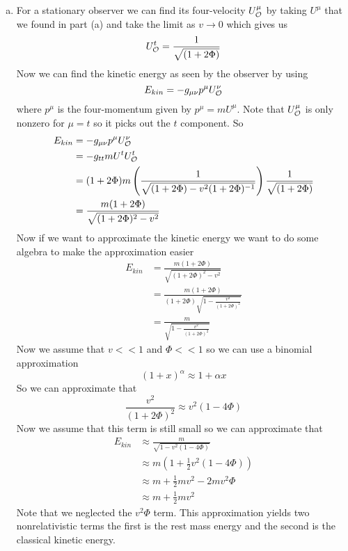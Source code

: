 \documentclass[11pt]{article}
\numberwithin{equation}{section}
\begin{document}
\begin{enumerate}[(a)]
\item
For a stationary observer we can find its four-velocity $U^{\mu}_{\mathcal{O}}$ by taking $U^{\mu}$ that we found in part (a) and take the limit as $v\rightarrow 0$ which gives us 
$$U^{t}_{\mathcal{O}} = \frac{1}{\sqrt{(1+2\Phi)}}$$
Now we can find the kinetic energy as seen by the observer by using
$$E_{kin} = -g_{\mu\nu}p^{\mu}U^{\nu}_{\mathcal{O}}$$
where $p^{\mu}$ is the four-momentum given by $p^{\mu} = mU^{\mu}$. Note that $U^{\mu}_{\mathcal{O}}$ is only nonzero for $\mu=t$ so it picks out the $t$ component. So
\begin{align*}
E_{kin} &= -g_{\mu\nu}p^{\mu}U^{\nu}_{\mathcal{O}}\\
&= -g_{tt}mU^{t}U^{t}_{\mathcal{O}}\\
&= (1+2\Phi)m\left(\frac{1}{\sqrt{(1+2\Phi) - v^2(1+2\Phi)^{-1}}}\right)\frac{1}{\sqrt{(1+2\Phi)}}\\
&= \frac{m(1+2\Phi)}{\sqrt{(1+2\Phi)^2 - v^2}}
\end{align*}
Now if we want to approximate the kinetic energy we want to do some algebra to make the approximation easier
\begin{align*}
E_{kin} &= \frac{m(1+2\Phi)}{\sqrt{(1+2\Phi)^2 - v^2}}\\
&= \frac{m(1+2\Phi)}{(1+2\Phi)\sqrt{1 - \frac{v^2}{(1+2\Phi)^2}}}\\
&= \frac{m}{\sqrt{1 - \frac{v^2}{(1+2\Phi)^2}}}
\end{align*}
Now we assume that $v<<1$ and $\Phi<<1$ so we can use a binomial approximation 
\begin{equation}
(1+x)^{\alpha} \approx 1+\alpha x
\label{bio}
\end{equation}
So we can approximate that
$$\frac{v^2}{(1+2\Phi)^2} \approx v^2(1-4\Phi)$$
Now we assume that this term is still small so we can approximate that
\begin{align*}
E_{kin} &\approx \frac{m}{\sqrt{1 - v^2(1-4\Phi)}} \\
&\approx m\left(1 + \frac{1}{2}v^2(1-4\Phi)\right)\\ 
&\approx m + \frac{1}{2}mv^2-2mv^2\Phi\\
&\approx m + \frac{1}{2}mv^2
\end{align*}
Note that we neglected the $v^2\Phi$ term. This approximation yields two nonrelativistic terms the first is the rest mass energy and the second is the classical kinetic energy.


\end{enumerate}
\end{document}
